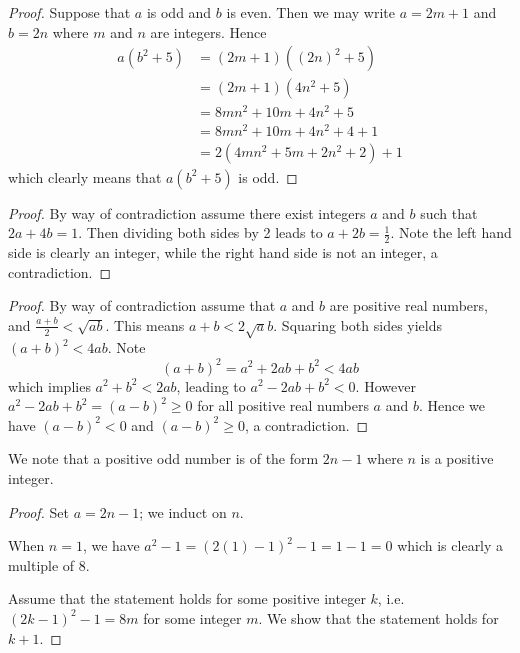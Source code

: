 \begin{questions}
    \begin{proof}
        Suppose that $a$ is odd and $b$ is even. Then we may write $a = 2m + 1$ and $b = 2n$ where $m$ and $n$ are integers. Hence
        \begin{align*}
            a(b^2+5) &= (2m+1)\left((2n)^2 + 5\right)\\
            &= (2m+1)(4n^2 + 5)\\
            &= 8mn^2 + 10m + 4n^2 + 5\\
            &= 8mn^2 + 10m + 4n^2 + 4 + 1\\
            &= 2(4mn^2 + 5m + 2n^2 + 2) + 1
        \end{align*}
        which clearly means that $a(b^2+5)$ is odd.
    \end{proof}

    \item \begin{proof}
        By way of contradiction assume there exist integers $a$ and $b$ such that $2a + 4b = 1$. Then dividing both sides by 2 leads to $a + 2b = \frac12$. Note the left hand side is clearly an integer, while the right hand side is not an integer, a contradiction.
    \end{proof}

    \item \begin{proof}
        By way of contradiction assume that $a$ and $b$ are positive real numbers, and $\frac{a+b}{2} < \sqrt{ab}$. This means $a+b<2\sqrt ab$. Squaring both sides yields $(a+b)^2 < 4ab$. Note
        \[
            (a+b)^2 = a^2 + 2ab + b^2 < 4ab
        \]
        which implies $a^2 + b^2 < 2ab$, leading to $a^2 - 2ab + b^2 < 0$. However $a^2 - 2ab + b^2 = (a-b)^2 \geq 0$ for all positive real numbers $a$ and $b$. Hence we have $(a-b)^2 < 0$ and $(a-b)^2 \geq 0$, a contradiction.
    \end{proof}

    \item We note that a positive odd number is of the form $2n - 1$ where $n$ is a positive integer.
    \begin{proof}
        Set $a = 2n - 1$; we induct on $n$.

        When $n = 1$, we have $a^2 - 1 = (2(1) - 1)^2 - 1 = 1 - 1 = 0$ which is clearly a multiple of 8.

        Assume that the statement holds for some positive integer $k$, i.e. $(2k-1)^2 - 1 = 8m$ for some integer $m$. We show that the statement holds for $k + 1$.


\end{proof}
\end{questions}
